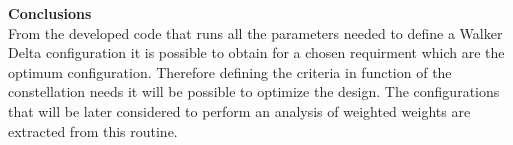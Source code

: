  
\textbf{Conclusions}\\  
From the developed code that runs all the parameters needed to define a Walker Delta configuration it is possible to obtain for a chosen requirment which are the optimum configuration. Therefore defining the criteria in function of the constellation needs it will be possible to optimize the design. 
The configurations that will be later considered to perform an analysis of weighted weights are extracted from this routine.